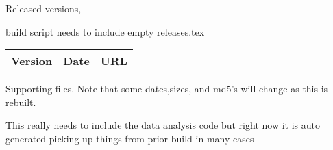 \documentclass[aps,secnumarabic,balancelastpage,amsmath,amssymb,nofootinbib]{revtex4}
\newcommand{\mjmbasename}{\jobname}
\begin{document}
Released versions,

build script needs to include empty releases.tex
\begin{table}[H] \centering
\begin{tabular}{|r|r|l|}
Version & Date & URL    \\
\hline

\hline
\end{tabular}
\end{table}





%

\begin{minipage}{\linewidth}
%
%
\mjmshowbib
\end{minipage}





\vspace{1cm}
Supporting files. Note that some dates,sizes, and md5's will change as this is
rebuilt.

This really needs to include the data analysis code 
but right now it is auto generated picking up things from prior
build in many cases 

\end{document}
